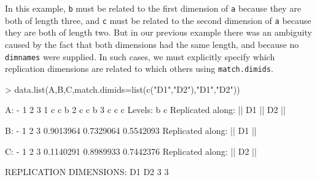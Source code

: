 \documentclass{article}
\newcommand{\code}[1]{\texttt{#1}}
\numberwithin{exercise}{section}
\begin{document}
In this example, \code{b} must be related to the first dimension of \code{a} because they are both of length three, and \code{c} must be related to the second dimension of \code{a} because they are both of length two.  But in our previous example there was an ambiguity caused by the fact that both dimensions had the same length, and because no \code{dimnames} were supplied.  In such cases, we must explicitly specify which replication dimensions are related to which others using \code{match.dimids}.
\begin{Schunk}
\begin{Sinput}
> data.list(A,B,C,match.dimids=list(c("D1","D2"),"D1","D2"))
\end{Sinput}
\begin{Soutput}
A:
-
  1 2 3
1 c c b
2 c c b
3 c c c
Levels: b c
Replicated along:  || D1 || D2 || 


B:
-
        1         2         3 
0.9013964 0.7329064 0.5542093 
Replicated along:  || D1 || 


C:
-
        1         2         3 
0.1140291 0.8989933 0.7442376 
Replicated along:  || D2 || 


REPLICATION DIMENSIONS: 
D1 D2 
 3  3 
\end{Soutput}
\end{Schunk}



\end{document}
